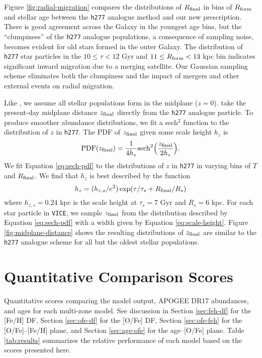 \documentclass[twocolumn,twocolappendix,linenumbers]{aastex631}
\newcommand{\vice}{{\tt VICE}\xspace}
\newcommand{\hydro}{{\tt h277}\xspace}
\begin{document}
Figure \ref{fig:radial-migration} compares the distributions of $R_{\rm final}$ in bins of $R_{\rm form}$ and stellar age between the \hydro analogue method and our new prescription. There is good agreement across the Galaxy in the youngest age bins, but the ``clumpiness'' of the \hydro analogue populations, a consequence of sampling noise, becomes evident for old stars formed in the outer Galaxy. The distribution of \hydro star particles in the $10\leq\tau<12$ Gyr and $11\leq R_{\rm form}<13$ kpc bin indicates significant inward migration due to a merging satellite. Our Gaussian sampling scheme eliminates both the clumpiness and the impact of mergers and other external events on radial migration.

Like , we assume all stellar populations form in the midplane ($z=0$).  take the present-day midplane distance $z_{\rm final}$ directly from the \hydro analogue particle. To produce smoother abundance distributions, we fit a sech$^2$ function \citep{Spitzer1942} to the distribution of $z$ in \hydro. The PDF of $z_{\rm final}$ given some scale height $h_z$ is
\begin{equation}
    {\rm PDF}(z_{\rm final}) = \frac{1}{4 h_z} {\rm sech}^2\Big(\frac{z_{\rm final}}{2 h_z}\Big).
    \label{eq:sech-pdf}
\end{equation}
We fit Equation \ref{eq:sech-pdf} to the distributions of $z$ in \hydro in varying bins of $T$ and $R_{\rm final}$. We find that $h_z$ is best described by the function
\begin{equation}
    h_z = (h_{z,s}/e^2) \exp(\tau/\tau_s + R_{\rm final}/R_s)
    \label{eq:scale-height}
\end{equation}
where $h_{z,s}=0.24$ kpc is the scale height at $\tau_s=7$ Gyr and $R_s=6$ kpc.
For each star particle in \vice, we sample $z_{\rm final}$ from the distribution described by Equation \ref{eq:sech-pdf} with a width given by Equation \ref{eq:scale-height}. Figure \ref{fig:midplane-distance} shows the resulting distributions of $z_{\rm final}$ are similar to the \hydro analogue scheme for all but the oldest stellar populations.

\section{\bf Quantitative Comparison Scores}
\label{app:quantitative-scores}

\begin{table*}
\centering
\caption{Quantitative scores comparing the model output,
APOGEE DR17 abundances, and  ages for each multi-zone
model. See discussion in Section \ref{sec:feh-df} for the [Fe/H] DF, 
Section \ref{sec:ofe-df} for the [O/Fe] DF, Section \ref{sec:ofe-feh} for the 
[O/Fe]--[Fe/H] plane, and Section \ref{sec:age-ofe} for the age--[O/Fe] 
plane. Table \ref{tab:results} summarizes the relative performance
of each model based on the scores presented here.}
\label{tab:scores}
\end{table*}
\end{document}
